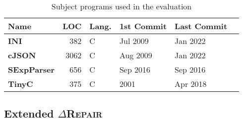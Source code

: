 \documentclass[acmsmall,screen,review,anonymous]{acmart}
\newcommand{\approach}{\textsc{$\Delta$Repair}\xspace}
\newcommand{\drepair}{\approach}
\def\<#1>{\texttt{#1}}
\begin{document}
\begin{comment}
In the case of insert, however, in most cases, the character being inserted,
and the character that originally caused a parse error can still cause a parse
error. Hence, we apply linear search instead (we provide code examples for binary and linear search in \Cref{lst:bsearch} and \Cref{lst:extenditeminsert}, respectively).%
\par
If this succeeds, the parse boundary after the repair
would be larger than the old parse boundary. Hence, if the parse boundary has
increased (\Cref{lst:repairandextend}), then
the
repair is saved. If not, the repair is discarded.
\begin{lstlisting}[caption=Repair and extend,label={lst:repairandextend}]
def repair_and_extend(item):
  return [apply_delete(item)] + apply_insert(item)
\end{lstlisting}
\vspace{\baselineskip}
The output from \<find\_fixes()> (\Cref{lst:findfixes}) is a set of repair
threads with the least number of repairs from the passed input string.

\approach assumes the parser correctly signals
\emph{incomplete} for incomplete inputs, \emph{incorrect} for other invalid
inputs, and \emph{complete} if the input was valid. 
Given this, \drepair algorithm works as follows (\Cref{fig:brepair_flowchart}):

\end{comment}


\begin{table}[!tbp]\centering
\caption{Subject programs used in the evaluation}
\begin{tabular}{|l | r | l | l | l | l |}
\hline
\textbf{Name} & \textbf{LOC} & \textbf{Lang.} & \textbf{1{st} Commit} & \textbf{Last Commit} \\
\hline
\textbf{INI} & 382 & C & Jul 2009 & Jan 2022\\
\textbf{cJSON} & 3062 & C & Aug 2009 & Jan 2022\\
\textbf{SExpParser} & 656 & C & Sep 2016 & Sep 2016\\
\textbf{TinyC} & 375 & C & 2001 & Apr 2018\\
\hline
\end{tabular}
\label{tab:subject-programs}
\end{table}

\subsection*{Extended \drepair}
\end{document}
